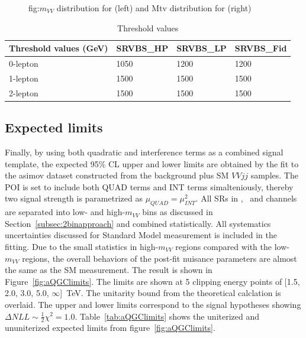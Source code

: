 \begin{figure}[ht]
        \caption{fig:$m_{VV}$ distribution for \tlep (left) and Mtv distribution for \zlep (right)}
        \label{fig:mVVdist}
\end{figure}

\begin{table}[ht!]
\small
\begin{center}
\begin{tabular}{ | l || l | l | l |}
\hline
Threshold values (GeV)          & SRVBS\_HP  & SRVBS\_LP & SRVBS\_Fid  \tabularnewline \hline
0-lepton & 1050      & 1200     & 1200       \tabularnewline \hline
1-lepton & 1500      & 1500     & 1500       \tabularnewline \hline
2-lepton & 1500      & 1500     & 1500       \tabularnewline \hline
\end{tabular}
\caption{Threshold values}
\label{tab:2binthreshold}
\end{center}
\end{table}



\subsection{Expected limits}

Finally, by using both quadratic and interference terms as a combined signal template,
the expected 95\% CL upper and lower limits are obtained by the fit to the asimov dataset constructed
from the background plus SM $VVjj$ samples.
The POI is set to include both QUAD terms and INT terms simalteniously, thereby two signal strength is parametrized as $\mu_{QUAD} = \mu_{INT}^2$.
All SRs in \zlep, \olep\ and \tlep channels are separated into low- and high-$m_{VV}$ bins as discussed in Section~\ref{subsec:2binapproach}
and combined statistically.
All systematics uncertainties discussed for Standard Model measurement is included in the fitting.
Due to the small statistics in high-$m_{VV}$ regions compared with the low-$m_{VV}$ regions,
the overall behaviors of the post-fit nuisance parameters are almost the same as the SM measurement.
The result is shown in Figure~\ref{fig:aQGClimits}.
The limits are shown at 5 clipping energy points of [1.5, 2.0, 3.0, 5.0, $\infty$]~TeV.
The unitarity bound from the theoretical calclation \cite{PhysRevD.101.113003} is overlaid.
The upper and lower limits correspond to the signal hypotheses showing $\Delta NLL \sim \frac{1}{2}\chi^2 = 1.0$.
Table~\ref{tab:aQGClimits} shows the uniterized and ununiterized expected limits from figure~\ref{fig:aQGClimits}.

